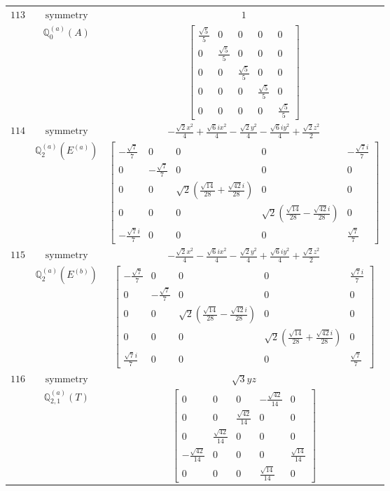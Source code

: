 \documentclass[fleqn,8pt,landscape]{jsarticle}
\begin{document}
\begin{longtable}{ccc}
$ 113 $ & $ \text{symmetry} $ & $ 1 $ \\
$  $ & $ \mathbb{Q}_{0}^{(a)}(A) $ & $ \begin{bmatrix} \frac{\sqrt{5}}{5} & 0 & 0 & 0 & 0 \\ 0 & \frac{\sqrt{5}}{5} & 0 & 0 & 0 \\ 0 & 0 & \frac{\sqrt{5}}{5} & 0 & 0 \\ 0 & 0 & 0 & \frac{\sqrt{5}}{5} & 0 \\ 0 & 0 & 0 & 0 & \frac{\sqrt{5}}{5} \end{bmatrix} $ \\ \hline
$ 114 $ & $ \text{symmetry} $ & $ - \frac{\sqrt{2} x^{2}}{4} + \frac{\sqrt{6} i x^{2}}{4} - \frac{\sqrt{2} y^{2}}{4} - \frac{\sqrt{6} i y^{2}}{4} + \frac{\sqrt{2} z^{2}}{2} $ \\
$  $ & $ \mathbb{Q}_{2}^{(a)}(E^{(a)}) $ & $ \begin{bmatrix} - \frac{\sqrt{7}}{7} & 0 & 0 & 0 & - \frac{\sqrt{7} i}{7} \\ 0 & - \frac{\sqrt{7}}{7} & 0 & 0 & 0 \\ 0 & 0 & \sqrt{2} \left(\frac{\sqrt{14}}{28} + \frac{\sqrt{42} i}{28}\right) & 0 & 0 \\ 0 & 0 & 0 & \sqrt{2} \left(\frac{\sqrt{14}}{28} - \frac{\sqrt{42} i}{28}\right) & 0 \\ - \frac{\sqrt{7} i}{7} & 0 & 0 & 0 & \frac{\sqrt{7}}{7} \end{bmatrix} $ \\ \hline
$ 115 $ & $ \text{symmetry} $ & $ - \frac{\sqrt{2} x^{2}}{4} - \frac{\sqrt{6} i x^{2}}{4} - \frac{\sqrt{2} y^{2}}{4} + \frac{\sqrt{6} i y^{2}}{4} + \frac{\sqrt{2} z^{2}}{2} $ \\
$  $ & $ \mathbb{Q}_{2}^{(a)}(E^{(b)}) $ & $ \begin{bmatrix} - \frac{\sqrt{7}}{7} & 0 & 0 & 0 & \frac{\sqrt{7} i}{7} \\ 0 & - \frac{\sqrt{7}}{7} & 0 & 0 & 0 \\ 0 & 0 & \sqrt{2} \left(\frac{\sqrt{14}}{28} - \frac{\sqrt{42} i}{28}\right) & 0 & 0 \\ 0 & 0 & 0 & \sqrt{2} \left(\frac{\sqrt{14}}{28} + \frac{\sqrt{42} i}{28}\right) & 0 \\ \frac{\sqrt{7} i}{7} & 0 & 0 & 0 & \frac{\sqrt{7}}{7} \end{bmatrix} $ \\ \hline
$ 116 $ & $ \text{symmetry} $ & $ \sqrt{3} y z $ \\
$  $ & $ \mathbb{Q}_{2,1}^{(a)}(T) $ & $ \begin{bmatrix} 0 & 0 & 0 & - \frac{\sqrt{42}}{14} & 0 \\ 0 & 0 & \frac{\sqrt{42}}{14} & 0 & 0 \\ 0 & \frac{\sqrt{42}}{14} & 0 & 0 & 0 \\ - \frac{\sqrt{42}}{14} & 0 & 0 & 0 & \frac{\sqrt{14}}{14} \\ 0 & 0 & 0 & \frac{\sqrt{14}}{14} & 0 \end{bmatrix} $ \\ \hline

\end{longtable}
\end{document}

